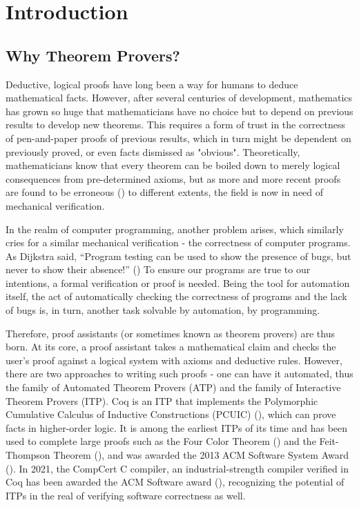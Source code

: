 \chapter{Introduction}

\section{Why Theorem Provers?}
Deductive, logical proofs have long been a way for humans to deduce mathematical
facts. However, after several centuries of development, mathematics has grown so
huge that mathematicians have no choice but to depend on previous results to
develop new theorems. This requires a form of trust in the correctness of
pen-and-paper proofs of previous results, which in turn might be dependent on
previously proved, or even facts dismissed as "obvious". Theoretically,
mathematicians know that every theorem can be boiled down to merely logical
consequences from pre-determined axioms, but as more and more recent proofs are
found to be erroneous (\cite{voevodsky_2018}) to different extents, the field is
now in need of mechanical verification.

In the realm of computer programming, another problem arises, which similarly
cries for a similar mechanical verification - the correctness of computer
programs. As Dijkstra said, “Program testing can be used to show the presence of
bugs, but never to show their absence!” (\cite{dijkstra1970notes}) To ensure our
programs are true to our intentions, a formal verification or proof is needed.
Being the tool for automation itself, the act of automatically checking the
correctness of programs and the lack of bugs is, in turn, another task solvable
by automation, by programming.

Therefore, proof assistants (or sometimes known as theorem provers) are thus
born. At its core, a proof assistant takes a mathematical claim and checks the
user's proof against a logical system with axioms and deductive rules. However,
there are two approaches to writing such proofs - one can have it automated,
thus the family of Automated Theorem Provers (ATP) and the family of Interactive
Theorem Provers (ITP). Coq is an ITP that implements the Polymorphic Cumulative
Calculus of Inductive Constructions (PCUIC) (\cite{pcuic2017timany}), which can
prove facts in higher-order logic. It is among the earliest ITPs of its time and
has been used to complete large proofs such as the Four Color
Theorem (\cite{gonthier2008four}) and the Feit-Thompson
Theorem (\cite{gonthier2013machine}), and was awarded the 2013 ACM Software System
Award (\cite{herbelin_2014}). In 2021, the CompCert C compiler, an
industrial-strength compiler verified in Coq has been awarded the ACM Software
award (\cite{acm_award_2022}), recognizing the potential of ITPs in the real of
verifying software correctness as well.

